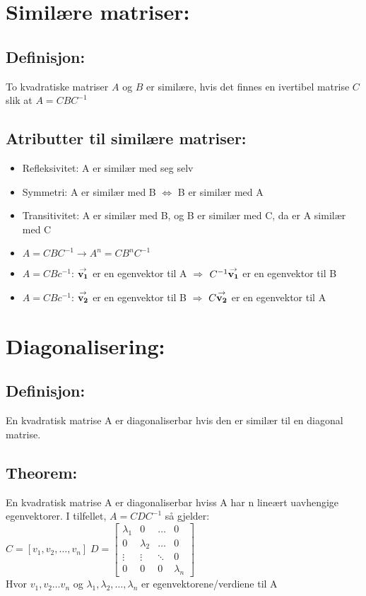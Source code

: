 \documentclass[12pt,a4paper,twocolumn,twoside]{article}
\def\vector#1{\bold{\stackrel{\rightarrow}{#1}}}
\begin{document}
\section*{Similære matriser:}
\subsection*{Definisjon:}
To kvadratiske matriser $A$ og $B$ er similære, hvis det finnes en ivertibel matrise $C$ slik at $A=CBC^{-1}$
\subsection*{Atributter til similære matriser:}
\begin{itemize}[topsep=0pt,itemsep=0pt, partopsep=0pt]
    \item Refleksivitet: A er similær med seg selv
    \item Symmetri: A er similær med B $\Leftrightarrow$ B er similær med A
    \item Transitivitet: A er similær med B, og B er similær med C, da er A similær med C
    \item $A=CBC^{-1}\rightarrow A^n=CB^nC^{-1}$
    \item $A=CBc^{-1}$: $\vector{v_1}$ er en egenvektor til A $\Rightarrow$ $C^{-1}\vector{v_1}$ er en egenvektor til B
    \item $A=CBc^{-1}$: $\vector{v_2}$ er en egenvektor til B $\Rightarrow$ $C\vector{v_2}$ er en egenvektor til A
\end{itemize}

\section*{Diagonalisering:}
\subsection*{Definisjon:}
En kvadratisk matrise A er diagonaliserbar hvis den er similær til en diagonal matrise.
\subsection*{Theorem:}
En kvadratisk matrise A er diagonaliserbar hviss A har n lineært uavhengige egenvektorer.
I tilfellet, $A=CDC^{-1}$ så gjelder:\\
$C=[v_1,v_2,\dots,v_n] \; D=\begin{bmatrix}
    \lambda_1 & 0 & \dots & 0\\
    0 & \lambda_2 & \dots & 0\\
    \vdots & \vdots & \ddots & 0\\
    0 & 0 & 0 & \lambda_n
\end{bmatrix}$\\
Hvor $v_1,v_2\dots v_n$ og $\lambda_1,\lambda_2, \dots,\lambda_n$ er egenvektorene/verdiene til A
\end{document}
